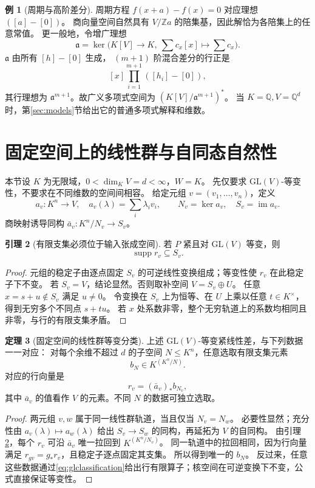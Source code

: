 \documentclass[UTF8,11pt,a4paper]{ctexart}
\theoremstyle{definition}
\newtheorem{theorem}{定理}[section]
\newtheorem{lemma}[theorem]{引理}
\newtheorem{example}[theorem]{例}
\newcommand{\Q}{\mathbb Q}
\newcommand{\Z}{\mathbb Z}
\newcommand{\im}{\operatorname{im}}
\newcommand{\supp}{\operatorname{supp}}
\numberwithin{equation}{section}
\begin{document}
\begin{example}[周期与高阶差分]
周期方程 $f(x+a)-f(x)=0$ 对应理想 $([a]-[0])$。
商向量空间自然具有 $V/\Z a$ 的陪集基，因此解恰为各陪集上的任意常值。
更一般地，令增广理想
\[
 \mathfrak a=\ker\bigl(K[V]\to K,\ \sum c_x[x]\mapsto\sum c_x\bigr).
\]
$\mathfrak a$ 由所有 $[h]-[0]$ 生成，
$(m+1)$ 阶混合差分的行正是
\[
 [x]\prod_{i=1}^{m+1}([h_i]-[0]),
\]
其行理想为 $\mathfrak a^{m+1}$。故广义多项式空间为 $(K[V]/\mathfrak a^{m+1})^*$。
当 $K=\Q,V=\Q^d$ 时，第\ref{sec:models}节给出它的普通多项式解释和维数。
\end{example}

\section{固定空间上的线性群与自同态自然性}\label{sec:fixednatural}
本节设 $K$ 为无限域，$0<\dim_KV=d<\infty$，$W=K$。
先仅要求 $\mathrm{GL}(V)$-等变性，不要求在不同维数的空间间相容。
给定元组 $v=(v_1,\ldots,v_n)$，定义
\[
 a_v:K^n\to V,\quad a_v(\lambda)=\sum_i\lambda_iv_i,
 \qquad N_v=\ker a_v,\quad S_v=\im a_v.
\]
商映射诱导同构 $\bar a_v:K^n/N_v\to S_v$。

\begin{lemma}[有限支集必须位于输入张成空间]\label{lem:supportspan}
若 $P$ 紧且对 $\mathrm{GL}(V)$ 等变，则
\[
 \supp r_v\subseteq S_v.
\]
\end{lemma}
\begin{proof}
元组的稳定子由逐点固定 $S_v$ 的可逆线性变换组成；等变性使 $r_v$ 在此稳定子下不变。
若 $S_v=V$，结论显然。否则取补空间 $V=S_v\oplus U$。
任意 $x=s+u\notin S_v$ 满足 $u\ne0$。
令变换在 $S_v$ 上为恒等、在 $U$ 上乘以任意 $t\in K^\times$，得到无穷多个不同点 $s+tu$。
若 $x$ 处系数非零，整个无穷轨道上的系数均相同且非零，与行的有限支集矛盾。
\end{proof}

\begin{theorem}[固定空间的线性群等变分类]\label{thm:glclassification}
上述 $\mathrm{GL}(V)$-等变紧线性差，与下列数据一一对应：
对每个余维不超过 $d$ 的子空间 $N\le K^n$，任意选取有限支集元素
\[
 b_N\in K^{(K^n/N)}.
\]
对应的行向量是
\begin{equation}\label{eq:glclassification}
 r_v=(\bar a_v)_*b_{N_v},
\end{equation}
其中 $\bar a_v$ 的值看作 $V$ 的元素。不同 $N$ 的数据可独立选取。
\end{theorem}
\begin{proof}
两元组 $v,w$ 属于同一线性群轨道，当且仅当 $N_v=N_w$。
必要性显然；充分性由 $a_v(\lambda)\mapsto a_w(\lambda)$ 给出 $S_v\to S_w$ 的同构，再延拓为 $V$ 的自同构。
由引理\ref{lem:supportspan}，每个 $r_v$ 可沿 $\bar a_v$ 唯一拉回到 $K^{(K^n/N_v)}$。
同一轨道中的拉回相同，因为行向量满足 $r_{gv}=g_*r_v$，且稳定子逐点固定其支集。
所以得到唯一的 $b_N$。
反过来，任意这些数据通过\eqref{eq:glclassification}给出行有限算子；核空间在可逆变换下不变，公式直接保证等变性。
\end{proof}
\end{document}
